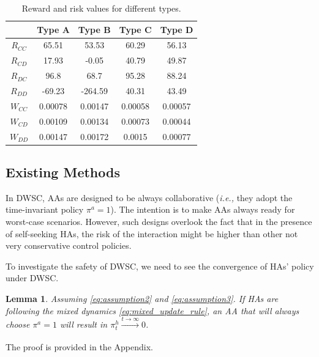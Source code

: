 \documentclass[letterpaper]{article} %
\newcommand{\ie}{\textit{i.e., }}
\newtheorem{lemma}{Lemma}
\begin{document}
\begin{table}[h]
  \begin{center}
    \begin{tabular}{c|c|c|c|c}
      & Type A & Type B & Type C & Type D \\
      \hline
      $R_{CC}$ & 65.51 & 53.53 & 60.29 & 56.13 \\\hline
      $R_{CD}$ & 17.93 & -0.05 & 40.79 & 49.87 \\\hline
      $R_{DC}$ & 96.8 & 68.7 & 95.28 & 88.24\\\hline
      $R_{DD}$ & -69.23 & -264.59 & 40.31 & 43.49 \\\hline
      $W_{CC}$ & 0.00078 & 0.00147 & 0.00058 & 0.00057 \\\hline
      $W_{CD}$ & 0.00109 & 0.00134 & 0.00073 & 0.00044 \\\hline
      $W_{DD}$ & 0.00147 & 0.00172 & 0.0015 & 0.00077
    \end{tabular}
    \caption{Reward and risk values for different types.}
    \label{tab:all_params}
  \end{center}
\end{table}

\subsection{Existing Methods}
In DWSC, AAs are designed to be always collaborative (\ie they adopt the time-invariant policy $\pi^a = 1$). The intention is to make AAs always ready for worst-case scenarios. However, such designs overlook the fact that in the presence of self-seeking HAs, the risk of the interaction might be higher than other not very conservative control policies.

To investigate the safety of DWSC, we need to see the convergence of HAs' policy under DWSC.
\begin{lemma}
\label{lem:dwsc_not_safe}
Assuming \eqref{eq:assumption2} and \eqref{eq:assumption3}. If HAs are following the mixed dynamics \eqref{eq:mixed_update_rule}, an AA that will always choose $\pi^a = 1$  will result in $\pi^h_t \xrightarrow[]{t\rightarrow\infty} 0$.
\end{lemma}
The proof is provided in the Appendix.
\end{document}
